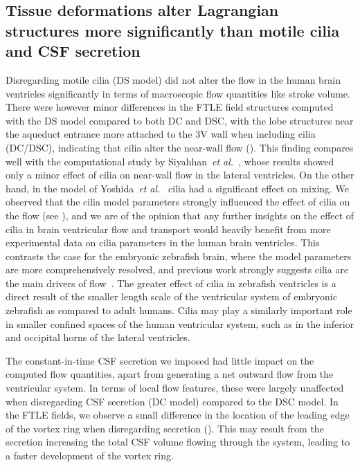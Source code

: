 \documentclass{template}
\begin{document}
\subsection{Tissue deformations alter Lagrangian structures more significantly
than motile cilia and CSF secretion}
Disregarding motile cilia (DS model) did not alter the flow in the human brain ventricles significantly
in terms of macroscopic flow quantities like stroke volume. 
There were however minor differences in the FTLE field structures computed with the DS model compared
to both DC and DSC, with the lobe structures near the aqueduct
entrance more attached to the 3V wall when including cilia (DC/DSC),
indicating that cilia alter the near-wall flow ().
This finding compares well with the computational study
by Siyahhan~\emph{et al.}~\cite{Siyahhan2014FlowVentricles},
whose results showed only a minor effect of cilia on near-wall flow in the lateral
ventricles. On the other hand, in the model of Yoshida~\emph{et al.}~\cite{Yoshida2022EffectVentricles} 
cilia had a significant effect on mixing. We observed that the cilia model parameters
strongly influenced the effect of cilia on the flow (see ),
and we are of the opinion that any further insights on the effect of cilia in
brain ventricular flow and transport would heavily benefit from more experimental data
on cilia parameters in the human brain ventricles.
This contrasts the case for the embryonic zebrafish brain, where the model parameters
are more comprehensively resolved, and previous work strongly suggests cilia are
the main drivers of flow~\cite{Olstad2019CiliaryDevelopment, Herlyng2025AdvectionDiffusion}.
The greater effect of cilia in zebrafish ventricles is a direct result of the smaller
length scale of the ventricular system of embryonic zebrafish
as compared to adult humans. Cilia may play a similarly important
role in smaller confined spaces of the human ventricular system,
such as in the inferior and occipital horns of the lateral ventricles.

The constant-in-time CSF secretion we imposed had little impact on the
computed flow quantities, apart from generating a net outward flow from the
ventricular system. In terms of local flow features,
these were largely unaffected when disregarding CSF secretion (DC model)
compared to the DSC model. In the FTLE fields, we observe a small
difference in the location of the leading edge of the vortex ring
when disregarding secretion ().
This may result from the secretion increasing the total CSF volume
flowing through the system, leading to a faster development of the vortex ring.
\end{document}
